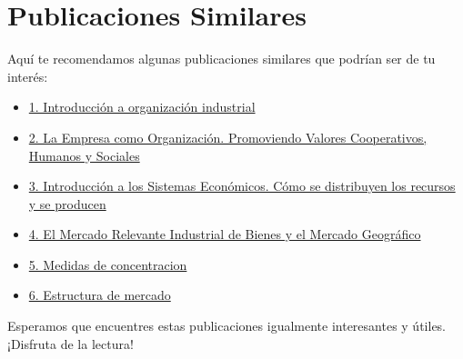\documentclass[
  letterpaper,
  DIV=11,
  numbers=noendperiod]{scrartcl}
\begin{document}
\hypertarget{publicaciones-similares}{%
\section{Publicaciones Similares}\label{publicaciones-similares}}

Aquí te recomendamos algunas publicaciones similares que podrían ser de
tu interés:

\begin{itemize}
\item
  \href{../2023-06-12-introducion-organizacion-industrial/index.qmd}{1.
  Introducción a organización industrial}
\item
  \href{../2023-06-13-empresa-como-organizacion/index.qmd}{2. La Empresa
  como Organización. Promoviendo Valores Cooperativos, Humanos y
  Sociales}
\item
  \href{../2023-06-13-sistemas-economicos/index.qmd}{3. Introducción a
  los Sistemas Económicos. Cómo se distribuyen los recursos y se
  producen}
\item
  \href{../2023-06-15-mercado-relevante-oi-cap-2/index.qmd}{4. El
  Mercado Relevante Industrial de Bienes y el Mercado Geográfico}
\item
  \href{../2023-06-16-concentracion-poder-oi-cap3/index.qmd}{5. Medidas
  de concentracion}
\item
  \href{../2023-06-17-estructura-mercado-oi-cap4/index.qmd}{6.
  Estructura de mercado}
\end{itemize}

Esperamos que encuentres estas publicaciones igualmente interesantes y
útiles. ¡Disfruta de la lectura!


\printbibliography
\end{document}
